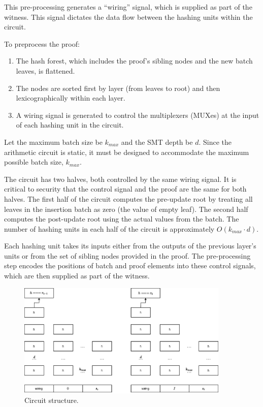 \documentclass[twocolumn]{article}
\begin{document}
This pre-processing generates a ``wiring'' signal, which is supplied as part of the witness. This signal dictates the data flow between the hashing units within the circuit.

To preprocess the proof:

\begin{enumerate}
    \item The hash forest, which includes the proof's sibling nodes and the new batch leaves, is flattened.
    \item The nodes are sorted first by layer (from leaves to root) and then lexicographically within each layer.
    \item A wiring signal is generated to control the multiplexers (MUXes) at the input of each hashing unit in the circuit.
\end{enumerate}

Let the maximum batch size be $k_{max}$ and the SMT depth be $d$. Since the arithmetic circuit is static, it must be designed to accommodate the maximum possible batch size, $k_{max}$.

The circuit has two halves, both controlled by the same wiring signal. It is critical to security that the control signal and the proof are the same for both halves. The first half of the circuit computes the pre-update root by treating all leaves in the insertion batch as zero (the value of empty leaf). The second half computes the post-update root using the actual values from the batch. The number of hashing units in each half of the circuit is approximately $O(k_{max} \cdot d)$.

Each hashing unit takes its inputs either from the outputs of the previous layer's units or from the set of sibling nodes provided in the proof. The pre-processing step encodes the positions of batch and proof elements into these control signals, which are then supplied as part of the witness.

\begin{figure}[!t]
    \centering
    \includegraphics[width=0.9\textwidth]{pic/smt-circuit.drawio}
    \caption{Circuit structure.}\label{fi:smt-circuit}
\end{figure}
\end{document}

